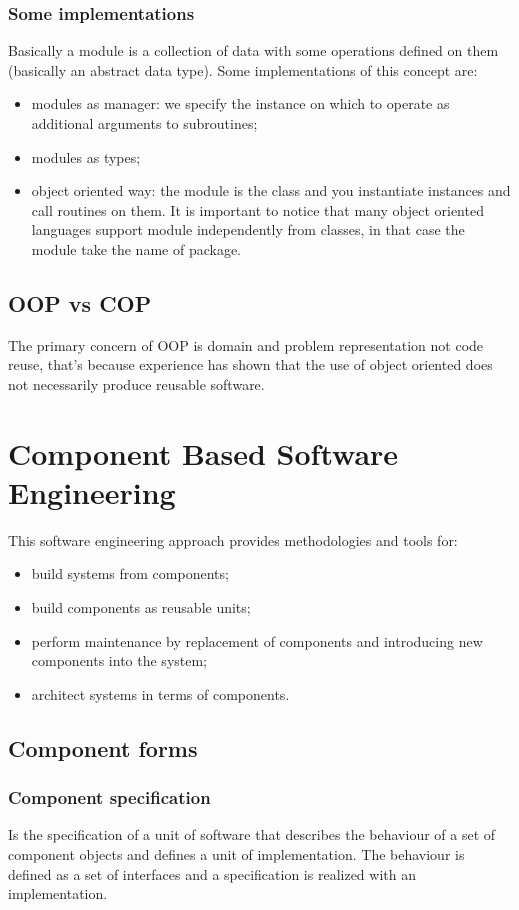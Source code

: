 \subsubsection{Some implementations}
Basically a module is a collection of data with some operations defined on them (basically an abstract data type).
Some implementations of this concept are:
\begin{itemize}
    \item modules as manager: we specify the instance on which to operate as additional arguments to subroutines;
    \item modules as types;
    \item object oriented way: the module is the class and you instantiate instances and call routines on them.
    It is important to notice that many object oriented languages support module independently from classes, in that case the module take the name of package.
\end{itemize}

\subsection{OOP vs COP}
The primary concern of OOP is domain and problem representation not code reuse, that's because experience has shown that the use of object oriented does not necessarily produce reusable software.

\section{Component Based Software Engineering}
This software engineering approach provides methodologies and tools for:
\begin{itemize}
    \item build systems from components;
    \item build components as reusable units;
    \item perform maintenance by replacement of components and introducing new components into the system;
    \item architect systems in terms of components.
\end{itemize}

\subsection{Component forms}
\subsubsection{Component specification}
Is the specification of a unit of software that describes the behaviour of a set of component objects and defines a unit of implementation.
The behaviour is defined as a set of interfaces and a specification is realized with an implementation.

